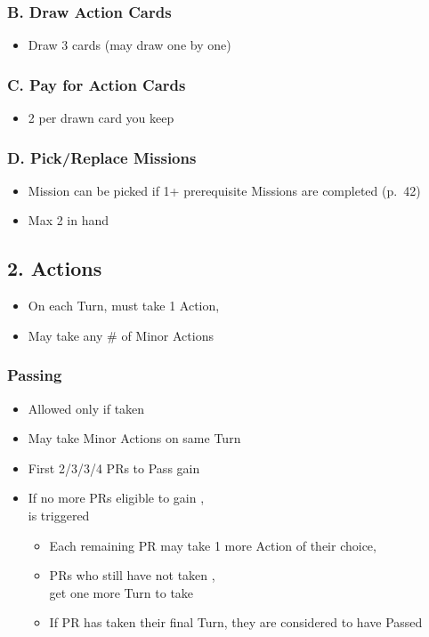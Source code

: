 \documentclass[10pt]{article}
\begin{document}
\subsubsection*{B. Draw Action Cards}

\begin{itemize}
	\item Draw 3 cards (may draw one by one)
\end{itemize}

\subsubsection*{C. Pay for Action Cards}
\begin{itemize}
	\item 2 \ducats per drawn card you keep
\end{itemize}

\subsubsection*{D. Pick/Replace Missions}
\begin{itemize}
	\item Mission can be picked if 1+ prerequisite Missions are completed (p.~42)
	\item Max 2 in hand
\end{itemize}

\subsection*{2. Actions}
\begin{itemize}
	\item On each Turn, must take 1 Action, 
	\item May take any \# of Minor Actions
\end{itemize}
\subsubsection*{Passing}
\begin{itemize}
	\item Allowed only if  taken
	\item May take Minor Actions on same Turn
	\item First 2/3/3/4 PRs to Pass gain \ducats
	\item If no more PRs eligible to gain \ducats,\\  is triggered
	\begin{itemize}
		\item Each remaining PR may take 1 more Action of their choice, 
		\item PRs who still have not taken ,\\ get one more Turn to take 
		\item If PR has taken their final Turn, they are considered to have Passed
	\end{itemize}
\end{itemize}
\end{document}
